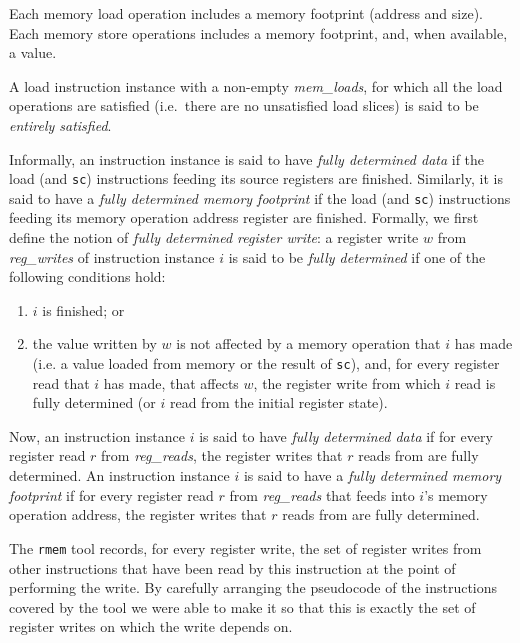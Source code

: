 Each memory load operation includes a memory footprint (address and size).
Each memory store operations includes a memory footprint, and, when available, a value.

A load instruction instance with a non-empty {\it mem\_loads}, for which all the load operations are satisfied (i.e.~there are no unsatisfied load slices) is said to be {\it entirely satisfied}.

Informally, an instruction instance is said to have {\it fully determined data} if the load (and {\tt sc}) instructions feeding its source registers are finished.
Similarly, it is said to have a {\it fully determined memory footprint} if the load (and {\tt sc}) instructions feeding its memory operation address register are finished.
%
Formally, we first define the notion of {\it fully determined register write}: a register write $w$ from {\it reg\_writes} of instruction instance $i$ is said to be {\it fully determined} if one of the following conditions hold:
\begin{enumerate}
\item $i$ is finished; or
\item the value written by $w$ is not affected by a memory operation that $i$ has made (i.e. a value loaded from memory or the result of {\tt sc}), and, for every register read that $i$ has made, that affects $w$, the register write from which $i$ read is fully determined (or $i$ read from the initial register state).
\end{enumerate}
Now, an instruction instance $i$ is said to have  {\it fully determined data} if for every register read $r$ from {\it reg\_reads}, the register writes that $r$ reads from are fully determined.
An instruction instance $i$ is said to have a {\it fully determined memory footprint} if for every register read $r$ from {\it reg\_reads} that feeds into $i$'s memory operation address, the register writes that $r$ reads from are fully determined.
\begin{commentary}
The {\tt rmem} tool records, for every register write, the set of register writes from other instructions that have been read by this instruction at the point of performing the write.
By carefully arranging the pseudocode of the instructions covered by the tool we were able to make it so that this is exactly the set of register writes on which the write depends on.
\end{commentary}


